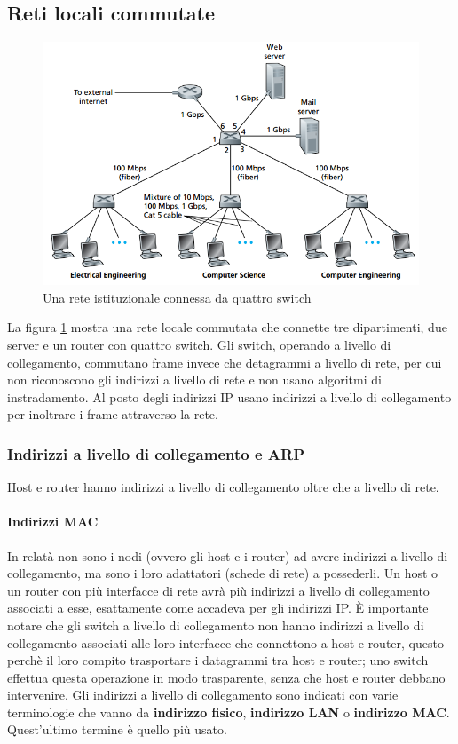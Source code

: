 \documentclass[11pt,a4paper]{article}
\begin{document}
{\subsection{Reti locali commutate}
\begin{figure}
	\includegraphics[scale=0.6]{img/082.png}
	\caption{Una rete istituzionale connessa da quattro switch}
	\label{fig: 082}
\end{figure}
La figura \ref{fig: 082} mostra una rete locale commutata che connette tre dipartimenti, due server e un router con quattro switch. Gli switch, operando a livello di collegamento, commutano frame invece che detagrammi a livello di rete, per cui non riconoscono gli indirizzi a livello di rete e non usano algoritmi di instradamento. Al posto degli indirizzi IP usano indirizzi a livello di collegamento per inoltrare i frame attraverso la rete.
\subsubsection{Indirizzi a livello di collegamento e ARP}
Host e router hanno indirizzi a livello di collegamento oltre che a livello di rete.
\paragraph{Indirizzi MAC}
In relatà non sono i nodi (ovvero gli host e i router) ad avere indirizzi a livello di collegamento, ma sono i loro adattatori (schede di rete) a possederli. Un host o un router con più interfacce di rete avrà più indirizzi a livello di collegamento associati a esse, esattamente come accadeva per gli indirizzi IP. È importante notare che gli switch a livello di collegamento non hanno indirizzi a livello di collegamento associati alle loro interfacce che connettono a host e router, questo perchè il loro compito  trasportare i datagrammi tra host e router; uno switch effettua questa operazione in modo trasparente, senza che host e router debbano intervenire. Gli indirizzi a livello di collegamento sono indicati con varie terminologie che vanno da \textbf{indirizzo fisico}, \textbf{indirizzo LAN} o \textbf{indirizzo MAC}. Quest'ultimo termine è quello più usato.

}
\end{document}
